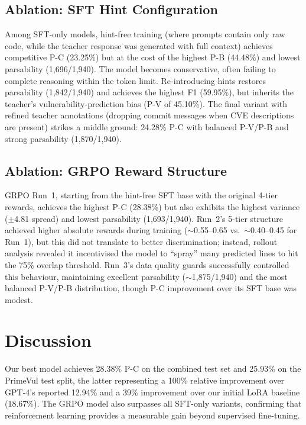 \documentclass{article}
\begin{document}
\subsection{Ablation: SFT Hint Configuration}

Among SFT-only models, hint-free training (where prompts contain only raw code, while the teacher response was generated with full context) achieves competitive P-C (23.25\%) but at the cost of the highest P-B (44.48\%) and lowest parsability (1,696/1,940). The model becomes conservative, often failing to complete reasoning within the token limit. Re-introducing hints restores parsability (1,842/1,940) and achieves the highest F1 (59.95\%), but inherits the teacher's vulnerability-prediction bias (P-V of 45.10\%). The final variant with refined teacher annotations (dropping commit messages when CVE descriptions are present) strikes a middle ground: 24.28\% P-C with balanced P-V/P-B and strong parsability (1,870/1,940).

\subsection{Ablation: GRPO Reward Structure}

GRPO Run~1, starting from the hint-free SFT base with the original 4-tier rewards, achieves the highest P-C (28.38\%) but also exhibits the highest variance ($\pm$4.81 spread) and lowest parsability (1,693/1,940). Run~2's 5-tier structure achieved higher absolute rewards during training ($\sim$0.55--0.65 vs.\ $\sim$0.40--0.45 for Run~1), but this did not translate to better discrimination; instead, rollout analysis revealed it incentivised the model to ``spray'' many predicted lines to hit the 75\% overlap threshold. Run~3's data quality guards successfully controlled this behaviour, maintaining excellent parsability ($\sim$1,875/1,940) and the most balanced P-V/P-B distribution, though P-C improvement over its SFT base was modest.

\section{Discussion}

Our best model achieves 28.38\% P-C on the combined test set and 25.93\% on the PrimeVul test split, the latter representing a 100\% relative improvement over GPT-4's reported 12.94\% and a 39\% improvement over our initial LoRA baseline (18.67\%). The GRPO model also surpasses all SFT-only variants, confirming that reinforcement learning provides a measurable gain beyond supervised fine-tuning.
\end{document}

